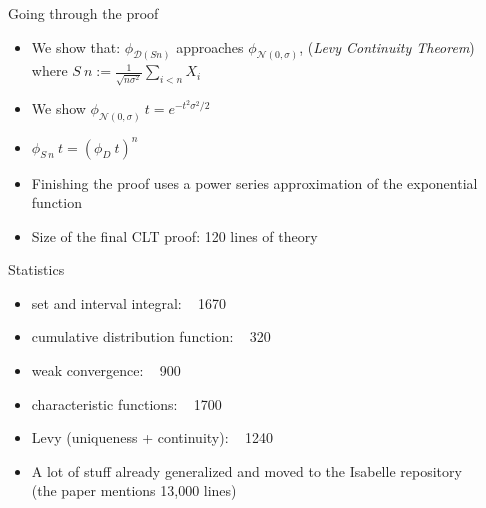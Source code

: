 \documentclass[usepdftitle=false]{beamer}
\begin{document}
\begin{frame}{Going through the proof} %
\begin{itemize}
  \item We show that: $\phi_{\mathcal{D}(S n)}$ approaches $\phi_{\mathcal{N}(0, \sigma)}$,
    (\emph{Levy Continuity Theorem}) \\
    where $S\ n := \frac{1}{\sqrt{n \sigma^2}} \sum_{i < n} X_i$
    
  \item We show $\phi_{\mathcal{N}(0, \sigma)}~t = e^{-t^2\sigma^2/2}$
  
  \item $\phi_{S\ n}~t = (\phi_D~t)^n$ 
  
  \item Finishing the proof uses a power series approximation of the exponential function
  
  \item Size of the final CLT proof: 120 lines of theory
\end{itemize}
\end{frame} %

\begin{frame}{Statistics} %
\begin{itemize}
\item set and interval integral: ~ 1670
\item cumulative distribution function: ~ 320
\item weak convergence: ~ 900
\item characteristic functions:  ~ 1700
\item Levy (uniqueness + continuity): ~ 1240
\item A lot of stuff already generalized and moved to the Isabelle repository \\
  (the paper mentions 13,000 lines)
\end{itemize}
\end{frame} %
\end{document}
